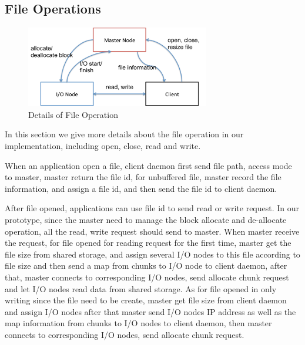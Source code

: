 
\subsection{File Operations}

\begin{figure}
\centering
\includegraphics[width=8cm]{img/file_operation}
\caption{Details of File Operation}
\label{implementation:file operation}
\end{figure}

In this section we give more details about the file operation in our implementation, including
open, close, read and write.

When an application open a file, client daemon first send file path, access mode to master,
master return the file id,
for unbuffered file, master record the file information, and assign a file id, and then send the
file id to client daemon.

After file opened, applications can use file id to send read or write request.
In our prototype, since the master need to manage the block allocate and de-allocate operation, all
the read, write request should send to master.
When master receive the request, for file opened for reading
request for the first time, master get the file size from shared storage, and assign several I/O
nodes to this file according to file size and then send a map from chunks to I/O node to client
daemon, after that, master connects to corresponding I/O nodes, send allocate chunk request and
let I/O nodes read data from shared storage.
As for file opened in only writing since the file need to be create, master get file size from
client daemon and assign I/O nodes after that master send I/O nodes IP address as well as the map
information from chunks to I/O nodes to client daemon, then master connects to corresponding I/O
nodes, send allocate chunk request.

